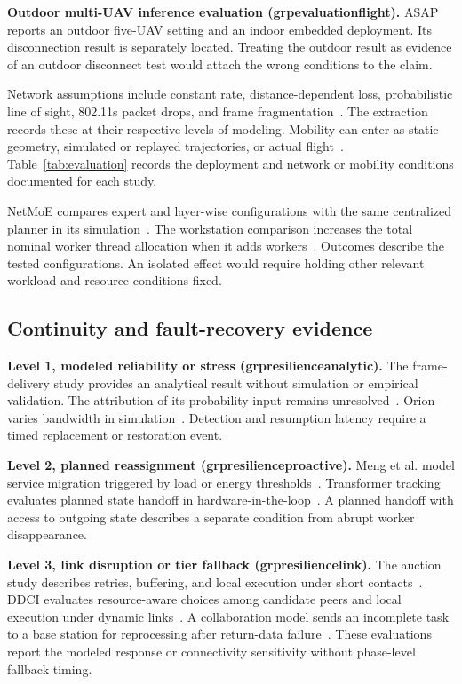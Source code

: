 \documentclass[pdflatex,sn-vancouver-num]{sn-jnl}
\newcommand{\groupcite}[2]{\csname grp#1#2\endcsname}
\begin{document}
\textbf{Outdoor multi-UAV inference evaluation (\groupcite{evaluation}{flight}).}
ASAP reports an outdoor five-UAV setting and an indoor embedded deployment. Its disconnection result is separately located. Treating the outdoor result as evidence of an outdoor disconnect test would attach the wrong conditions to the claim.

Network assumptions include constant rate, distance-dependent loss, probabilistic line of sight, 802.11s packet drops, and frame fragmentation~\cite{R0015,R0022,R0073,R0083,R0121}. The extraction records these at their respective levels of modeling. Mobility can enter as static geometry, simulated or replayed trajectories, or actual flight~\cite{R0003,R0014,R0074}. Table~\ref{tab:evaluation} records the deployment and network or mobility conditions documented for each study.

NetMoE compares expert and layer-wise configurations with the same centralized planner in its simulation~\cite{R0118}. The workstation comparison increases the total nominal worker thread allocation when it adds workers~\cite{R0125}. Outcomes describe the tested configurations. An isolated effect would require holding other relevant workload and resource conditions fixed.

\subsection{Continuity and fault-recovery evidence}
\textbf{Level 1, modeled reliability or stress (\groupcite{resilience}{analytic}).}
The frame-delivery study provides an analytical result without simulation or empirical validation. The attribution of its probability input remains unresolved~\cite{R0121}. Orion varies bandwidth in simulation~\cite{R0074}. Detection and resumption latency require a timed replacement or restoration event.

\textbf{Level 2, planned reassignment (\groupcite{resilience}{proactive}).}
Meng et al. model service migration triggered by load or energy thresholds~\cite{R0045}. Transformer tracking evaluates planned state handoff in hardware-in-the-loop~\cite{R0292}. A planned handoff with access to outgoing state describes a separate condition from abrupt worker disappearance.

\textbf{Level 3, link disruption or tier fallback (\groupcite{resilience}{link}).}
The auction study describes retries, buffering, and local execution under short contacts~\cite{R0058}. DDCI evaluates resource-aware choices among candidate peers and local execution under dynamic links~\cite{R0092}. A collaboration model sends an incomplete task to a base station for reprocessing after return-data failure~\cite{R0044}. These evaluations report the modeled response or connectivity sensitivity without phase-level fallback timing.
\end{document}
